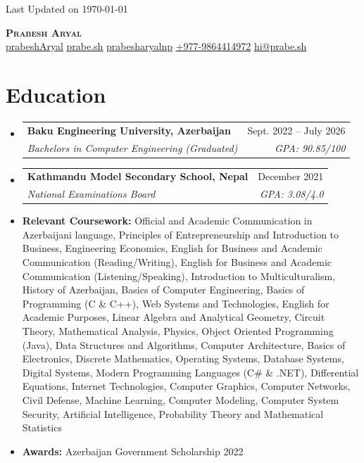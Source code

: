 \documentclass[letterpaper,11pt]{article}
\makeatletter
\newcommand{\resumeEntryHeading}[4]{
  \item %
    \begin{tabular*}{0.97\textwidth}[t]{p{0.7\textwidth}@{\extracolsep{\fill}}r} %
      \textbf{#1} & \small{#3} \\ %
      \textit{\small#2} & \textit{\small #4} \\ %
    \end{tabular*}
}
\newcommand{\resumeSectionListStart}{\begin{itemize}[leftmargin=0.15in, label={}, topsep=0pt, partopsep=0pt, itemsep=7pt]} %
\newcommand{\resumeSectionListEnd}{\end{itemize}}
\newcommand{\ContactEmail}{hi@prabe.sh}
\newcommand{\ContactPhone}{+977-9864414972}
\newcommand{\ContactTelLink}{+9779864414972}
\makeatother
\begin{document}
\begin{flushright}
  \color{gray}\small
  Last Updated on \today
\end{flushright}
\vspace{-10pt} %

\begin{center}
    \textbf{\Huge \scshape Prabesh Aryal} \\ \vspace{8pt}
    \small
     \href{https://github.com/prabeshAryal}{\underline{prabeshAryal}} \quad %
     \href{https://prabe.sh}{\underline{prabe.sh}} \quad
     \href{https://linkedin.com/in/prabesharyalnp}{\underline{prabesharyalnp}} \quad
     \href{tel:\ContactTelLink}{\underline{\ContactPhone}} \quad
     \href{mailto:\ContactEmail}{\underline{\ContactEmail}}
\end{center}

\section{Education}
  \resumeSectionListStart
    \resumeEntryHeading %
      {Baku Engineering University, \footnotesize{Azerbaijan}} %
      {Bachelors in Computer Engineering (Graduated)} %
      {Sept. 2022 -- July 2026} %
      {GPA: 90.85/100} %

    \resumeEntryHeading
      {Kathmandu Model Secondary School, \footnotesize{Nepal}} %
      {National Examinations Board} %
      {December 2021} %
      {GPA: 3.08/4.0} %

\item \small{
    \textbf{Relevant Coursework:}
    Official and Academic Communication in Azerbaijani language,
    Principles of Entrepreneurship and Introduction to Business,
    Engineering Economics,
    English for Business and Academic Communication (Reading/Writing),
    English for Business and Academic Communication (Listening/Speaking),
    Introduction to Multiculturalism,
    History of Azerbaijan,
    Basics of Computer Engineering,
    Basics of Programming (C \& C++),
    Web Systems and Technologies,
    English for Academic Purposes,
    Linear Algebra and Analytical Geometry,
    Circuit Theory,
    Mathematical Analysis,
    Physics,
    Object Oriented Programming (Java),
    Data Structures and Algorithms,
    Computer Architecture,
    Basics of Electronics,
    Discrete Mathematics,
    Operating Systems,
    Database Systems,
    Digital Systems,
    Modern Programming Languages (C\# \& .NET),
    Differential Equations,
    Internet Technologies,
    Computer Graphics,
    Computer Networks,
    Civil Defense,
    Machine Learning,
    Computer Modeling,
    Computer System Security,
    Artificial Intelligence,
    Probability Theory and Mathematical Statistics
} 
   \item \small{\textbf{Awards:} Azerbaijan Government Scholarship 2022}
  \resumeSectionListEnd
\end{document}
